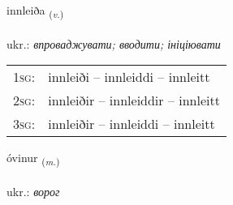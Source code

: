 \documentclass[frontgrid, backgrid]{flacards}\usepackage[]{graphicx}\usepackage[]{xcolor}
\begin{document}
\renewcommand{\flhead}{\vskip5pt \fboxsep=0pt {\small\bfseries\footnotesize Sagnorð | дієслово}}
\renewcommand{\fcfoot}{\vskip5pt \fboxsep=0pt \hspace{2pt}{\small\bfseries\footnotesize 3K}}

\renewcommand{\blhead}{\vskip5pt {\small\bfseries\footnotesize Sagnorð | дієслово }}
\renewcommand{\bcfoot}{\vskip5pt \hspace{2pt}{\small\bfseries\footnotesize 3K}}


{innleiða \small{\textsubscript{(\textit{v.})}} \\[1ex] %
\textphonetic{[ɪnleiða]} \\
ukr.: \emph{впроваджувати; вводити; ініціювати} \\  [2ex]
\renewcommand*{\arraystretch}{0.8}
\begin{tabular}{p{1cm}l}
\textsc{1sg}: & innleiði -- innleiddi -- innleitt \\ 
\textsc{2sg}: & innleiðir -- innleiddir -- innleitt \\ 
\textsc{3sg}: & innleiðir -- innleiddi -- innleitt \\ 
\end{tabular}
}

\renewcommand{\flhead}{\vskip5pt \fboxsep=0pt {\small\bfseries\footnotesize Nafnorð | іменник}}
\renewcommand{\fcfoot}{\vskip5pt \fboxsep=0pt \hspace{2pt}{\small\bfseries\footnotesize 3K}}

\renewcommand{\blhead}{\vskip5pt {\small\bfseries\footnotesize Nafnorð | іменник }}
\renewcommand{\bcfoot}{\vskip5pt \hspace{2pt}{\small\bfseries\footnotesize 3K}}


{óvinur \small{\textsubscript{(\textit{m.})}} \\[1ex] %
\textphonetic{[ouːvɪnʏr]} \\
ukr.: \emph{ворог} \\  [2ex]
\renewcommand*{\arraystretch}{0.8}
}
\end{document}
